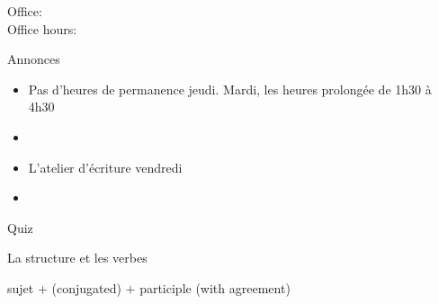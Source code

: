 \documentclass{beamer}
\subtitle[Passé composé (\lexi{être})]{Le passé composé avec \lexi{être} et plus d'aliments}
\begin{document}
  \begin{frame}
    \titlepage
    \tiny{Office: \\
          Office hours: }
  \end{frame}

  \begin{frame}{Annonces}
    \begin{itemize}
      \item Pas d'heures de permanence jeudi. Mardi, les heures prolongée de 1h30 à 4h30
      \item[] 
      \item L'atelier d'écriture vendredi
      \item[] 
    \end{itemize}
  \end{frame}

  \begin{frame}{}
    \begin{center}
      \Large Quiz
    \end{center}
  \end{frame}

  \begin{frame}{La structure et les verbes}
    \begin{center}
      sujet $+$  (conjugated) $+$ participle (with agreement)
    \end{center}
  \end{frame}
\end{document}
